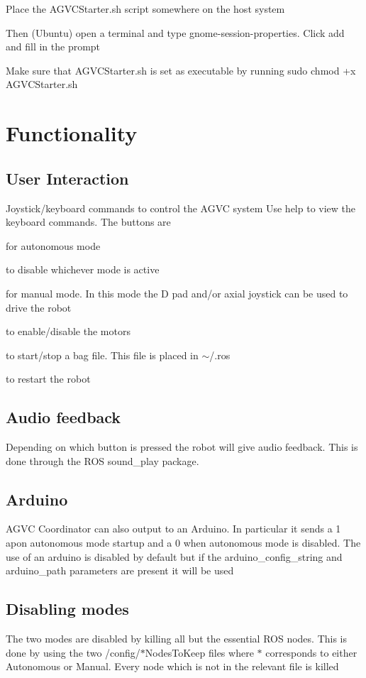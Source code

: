 \begin{DoxyItemize}
\item \-Place the \-A\-G\-V\-C\-Starter.\-sh script somewhere on the host system
\item \-Then (\-Ubuntu) open a terminal and type gnome-\/session-\/properties. \-Click add and fill in the prompt
\item \-Make sure that \-A\-G\-V\-C\-Starter.\-sh is set as executable by running sudo chmod +x \-A\-G\-V\-C\-Starter.\-sh
\end{DoxyItemize}\hypertarget{index_functionality}{}\section{\-Functionality}\label{index_functionality}
\hypertarget{index_ineraction}{}\subsection{\-User Interaction}\label{index_ineraction}
\-Joystick/keyboard commands to control the \-A\-G\-V\-C system \-Use help to view the keyboard commands. \-The buttons are
\begin{DoxyItemize}
\item {} for autonomous mode
\item {} to disable whichever mode is active
\item {} for manual mode. \-In this mode the \-D pad and/or axial joystick can be used to drive the robot
\item {} to enable/disable the motors
\item {} to start/stop a bag file. \-This file is placed in $\sim$/.ros
\item {} to restart the robot
\end{DoxyItemize}\hypertarget{index_audio}{}\subsection{\-Audio feedback}\label{index_audio}
\-Depending on which button is pressed the robot will give audio feedback. \-This is done through the \-R\-O\-S sound\-\_\-play package.\hypertarget{index_arduino}{}\subsection{\-Arduino}\label{index_arduino}
\-A\-G\-V\-C \-Coordinator can also output to an \-Arduino. \-In particular it sends a 1 apon autonomous mode startup and a 0 when autonomous mode is disabled. \-The use of an arduino is disabled by default but if the arduino\-\_\-config\-\_\-string and arduino\-\_\-path parameters are present it will be used\hypertarget{index_disable}{}\subsection{\-Disabling modes}\label{index_disable}
\-The two modes are disabled by killing all but the essential \-R\-O\-S nodes. \-This is done by using the two /config/$\ast$\-Nodes\-To\-Keep files where $\ast$ corresponds to either \-Autonomous or \-Manual. \-Every node which is not in the relevant file is killed 